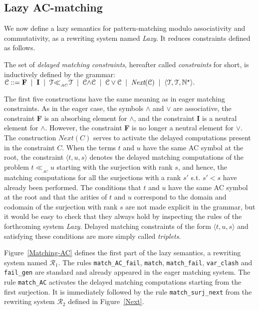\documentclass[submission,copyright,creativecommons]{eptcs}
\newcommand \matchth[3]{#1 {\ll}_{{ }_{#3}} {#2}}
\newcommand \matchAC[2]{\matchth{#1}{#2}{AC}}
\newcommand \trip[1]{\langle #1 \rangle}
\newcommand \Eu[1]{\EuScript{#1}}
\numberwithin{subcase}{case}
\begin{document}
\subsection{Lazy AC-matching}
\label{ac:matching:sec}

We now define a lazy semantics for pattern-matching modulo associativity and
commutativity, as a rewriting system named \emph{Lazy}. It reduces constraints
defined as follows.


\begin{definition}
The set of \emph{delayed matching
constraints}, hereafter called \emph{constraints} for short, is inductively
defined by the grammar: $ \Eu{C} ::= \textbf{F} \;\;|\;\; \textbf{I}
\;\;|\;\;
 \matchAC{\Eu{T}}{\Eu{T}} \;\;|\;\; \Eu{C} {\land} \Eu{C} \;\;|\;\;
  \Eu{C} \lor \Eu{C}
    \;\;|\;\;   \textit{Next}(\Eu{C}) \;\;|\;\;    
    \trip{\Eu{T},\Eu{T},\mathbb{N}^{\star}}.$
\end{definition} 
The first five constructions have the same meaning as in eager matching
constraints. As in the eager case, the symbols $\land$ and $\lor$ are
associative, the constraint \textbf{F} is an absorbing element for $\land$, and
the constraint \textbf{I} is a neutral element for  $\land$. However,  the
constraint \textbf{F} is no longer a neutral element for $\lor$.
 The construction $\textit{Next}(C)$ serves to activate the delayed computations
 present in the constraint $C$.
 When the terms $t$ and $u$ have the same AC symbol at the root, the constraint
 $\trip{t,u,s}$ denotes
the delayed matching computations of the problem $\matchAC{t}{u}$ starting with
the surjection 
with rank $s$, and hence, the matching computations for all the
surjections 
with a rank $s'$ s.t. $s' < s$ have already been performed. The conditions
that $t$ and $u$ have the same AC symbol at the root and that the arities of $t$
and $u$ correspond to the domain and codomain of 
the surjection with rank $s$ are not made
explicit in the grammar, but it would be easy to check that they always hold by
inspecting the rules of the forthcoming system \emph{Lazy}.
Delayed matching constraints of the form $\trip{t,u,s}$ and satisfying these
conditions are more simply called \emph{triplets}.


Figure~\ref{Matching-AC} defines the first part of the lazy
semantics, a rewriting system named $\mathcal{R}_1$.
The rules \texttt{match\_AC\_fail}, \texttt{match},  \texttt{match\_fail}, 
 \texttt{var\_clash} and \texttt{fail\_gen} are standard and
already appeared  in the eager matching system.
The rule \texttt{match\_AC} activates the delayed matching computations starting from 
the first surjection. It is immediately followed by the rule
\texttt{match\_surj\_next} from the rewriting system $\mathcal{R}_2$ defined in
Figure~\ref{Next}.
 
\end{document}
